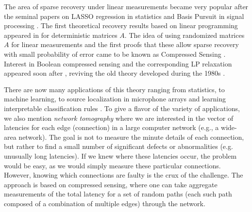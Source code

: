 The area of sparse recovery under linear measurements became very popular after the seminal 
papers on LASSO regression \cite{tibshirani1996regression} in statistics and Basis Pursuit in signal processing 
\cite{basis_pursuit}. The first theoretical recovery results based on linear programming appeared in 
\cite{donoho2001uncertainty} for deterministic matrices $A$.  The idea of using randomized matrices $A$ for linear measurements and the first proofs that these allow sparse recovery with small probability of error came to be known as Compressed Sensing \cite{donoho2006compressed}. Interest in Boolean compressed sensing and the corresponding LP relaxation appeared soon after \cite{atia2012boolean, malioutov2012boolean}, reviving the old theory developed during the 1980s \cite{MalioutovM2012}.

There are now many applications of this theory ranging from statistics, to machine 
learning, to source localization in microphone arrays \cite{malioutov2005sparse} and learning
interpretable classification rules \cite{malioutov2013exact}. To give
a flavor of the variety of applications, we also mention {\em network tomography}\cite{vardi1996network_tomography} where we are interested in the vector of latencies for each edge (connection) in a large
computer network (e.g., a wide-area network). The goal is not to measure the minute details of each connection, but rather to find a small number of significant defects or abnormalities (e.g. unusually long latencies). If we knew where these latencies occur, the problem would be easy, as we would simply measure these particular connections. However, knowing which connections are faulty is the crux of the challenge. The approach is based on compressed sensing, where one can take aggregate measurements of the total latency for a set of random paths (each such path composed of a combination of multiple edges) through the network.
